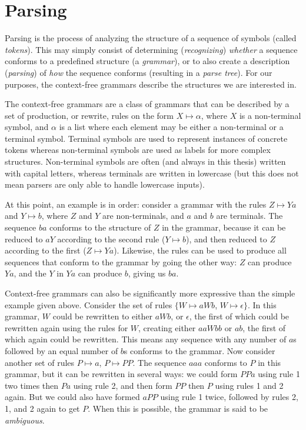 
\chapter{Parsing} \label{Parsing}

	Parsing is the process of analyzing the structure of a sequence of symbols
	(called \emph{tokens}). This may simply consist of determining
	(\emph{recognizing}) \emph{whether} a sequence conforms to a predefined structure
	(a \emph{grammar}), or to also create a description (\emph{parsing}) of \emph{how}
	the sequence conforms (resulting in a \emph{parse tree}).  For our
	purposes, the context-free grammars describe the structures we are
	interested in.

	The context-free grammars are a class of grammars that can be described by
	a set of production, or rewrite, rules on the form $X \mapsto \alpha$,
	where $X$ is a non-terminal symbol, and $\alpha$ is a list where each
	element may be either a non-terminal or a terminal symbol. Terminal symbols
	are used to represent instances of concrete tokens whereas non-terminal
	symbols are used as labels for more complex structures.
	Non-terminal symbols are often (and always in this thesis) written with
	capital letters, whereas terminals are written in lowercase (but this does
	not mean parsers are only able to handle lowercase inputs).

        At this point, an example is in order:
        consider a grammar with the rules $Z \mapsto Ya$ and $Y
	\mapsto b$, where $Z$ and $Y$ are non-terminals, and $a$ and $b$ are terminals.
	The sequence $ba$ conforms to the structure of $Z$ in the grammar, because
	it can be reduced to $aY$ according to the second rule ($Y \mapsto b$),
	and then reduced to $Z$ according to the first ($Z \mapsto Ya$).
	Likewise, the rules can be used to produce all sequences that conform to
	the grammar by going the other way: $Z$ can produce $Ya$, and the $Y$ in
	$Ya$ can produce $b$, giving us $ba$.

	Context-free grammars can also be significantly more expressive than the
	simple example given above. Consider the set of rules $\{W \mapsto aWb$, $W
	\mapsto \epsilon\}$. In this grammar, $W$ could be rewritten to either
	$aWb$, or $\epsilon$, the first of which could be rewritten again using the
	rules for $W$, creating either $aaWbb$ or $ab$, the first of which again
	could be rewritten. This means any sequence with any number of $a$s
	followed by an equal number of $b$s conforms to the grammar. Now consider
	another set of rules {$P \mapsto a$, $P \mapsto PP$}. The sequence $aaa$
	conforms to $P$ in this grammar, but it can be rewritten in several ways:
	we could form $PPa$ using rule 1 two times then $Pa$ using rule 2, and then
	form $PP$ then $P$ using rules 1 and 2 again. But we could also have formed
	$aPP$ using rule 1 twice, followed by rules 2, 1, and 2 again to get $P$.
	When this is possible, the grammar is said to be \emph{ambiguous}.

